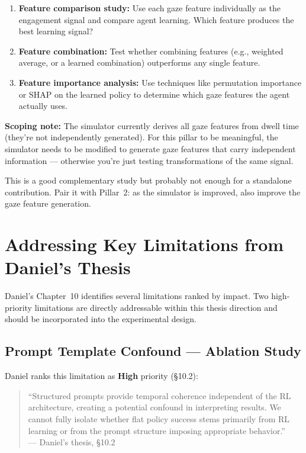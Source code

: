 \documentclass[11pt,a4paper]{article}
\begin{document}
\begin{enumerate}
    \item \textbf{Feature comparison study:} Use each gaze feature individually as the engagement signal and compare agent learning. Which feature produces the best learning signal?

    \item \textbf{Feature combination:} Test whether combining features (e.g., weighted average, or a learned combination) outperforms any single feature.

    \item \textbf{Feature importance analysis:} Use techniques like permutation importance or SHAP on the learned policy to determine which gaze features the agent actually uses.
\end{enumerate}

\textbf{Scoping note:} The simulator currently derives all gaze features from dwell time (they're not independently generated). For this pillar to be meaningful, the simulator needs to be modified to generate gaze features that carry independent information --- otherwise you're just testing transformations of the same signal.

This is a good complementary study but probably not enough for a standalone contribution. Pair it with Pillar~2: as the simulator is improved, also improve the gaze feature generation.


\section{Addressing Key Limitations from Daniel's Thesis}

Daniel's Chapter~10 identifies several limitations ranked by impact. Two high-priority limitations are directly addressable within this thesis direction and should be incorporated into the experimental design.

\subsection{Prompt Template Confound --- Ablation Study}

Daniel ranks this limitation as \textbf{High} priority (\S10.2):

\begin{quote}
``Structured prompts provide temporal coherence independent of the RL architecture, creating a potential confound in interpreting results. We cannot fully isolate whether flat policy success stems primarily from RL learning or from the prompt structure imposing appropriate behavior.''\\
--- Daniel's thesis, \S10.2
\end{quote}
\end{document}
